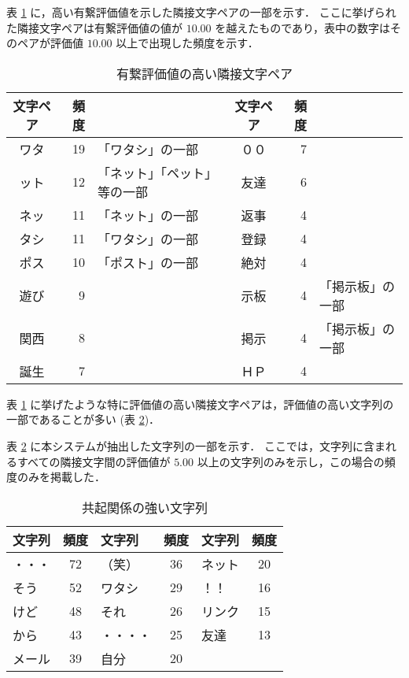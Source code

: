 表 \ref{tab:strongstring2} に，高い有繋評価値を示した隣接文字ペアの一部を示す．
ここに挙げられた隣接文字ペアは有繋評価値の値が $10.00$ を越えたものであり，表中の数字はそのペアが評価値 $10.00$ 以上で出現した頻度を示す．
\begin{table}[hbt]
\begin{minipage}{\textwidth}
\begin{center}
\caption{有繋評価値の高い隣接文字ペア}
\label{tab:strongstring2}
\begin{tabular}{crl|crl}
\hline
\hline
文字ペア & 頻度 & & 文字ペア & 頻度 & \\
\hline
ワタ & 19 & 「ワタシ」の一部             & ００ &  7 & \\
ット & 12 & 「ネット」「ペット」等の一部 & 友達 &  6 & \\
ネッ & 11 & 「ネット」の一部             & 返事 &  4 & \\
タシ & 11 & 「ワタシ」の一部             & 登録 &  4 & \\
ポス & 10 & 「ポスト」の一部             & 絶対 &  4 & \\
遊び &  9 &                              & 示板 &  4 & 「掲示板」の一部 \\
関西 &  8 &                              & 掲示 &  4 & 「掲示板」の一部 \\
誕生 &  7 &                              & ＨＰ &  4 & \\
\hline
\hline
\end{tabular}
\end{center}
\end{minipage}
\end{table}
表 \ref{tab:strongstring2} に挙げたような特に評価値の高い隣接文字ペアは，評価値の高い文字列の一部であることが多い (表 \ref{tab:over5seq})．

表 \ref{tab:over5seq} に本システムが抽出した文字列の一部を示す．
ここでは，文字列に含まれるすべての隣接文字間の評価値が $5.00$ 以上の文字列のみを示し，この場合の頻度のみを掲載した．
\begin{table}[hbt]
\begin{minipage}{\textwidth}
\begin{center}
\caption{共起関係の強い文字列}
\label{tab:over5seq}
\begin{tabular}{lc|lc|lc}
\hline
\hline
文字列   & 頻度 & 文字列 & 頻度 & 文字列 & 頻度 \\
\hline
・・・   & 72 & （笑）   & 36 & ネット   & 20 \\
そう     & 52 & ワタシ   & 29 & ！！     & 16 \\
けど     & 48 & それ     & 26 & リンク   & 15 \\
から     & 43 & ・・・・ & 25 & 友達     & 13 \\
メール   & 39 & 自分     & 20 &          &    \\
\hline
\hline
\end{tabular}
\end{center}
\end{minipage}
\end{table}
